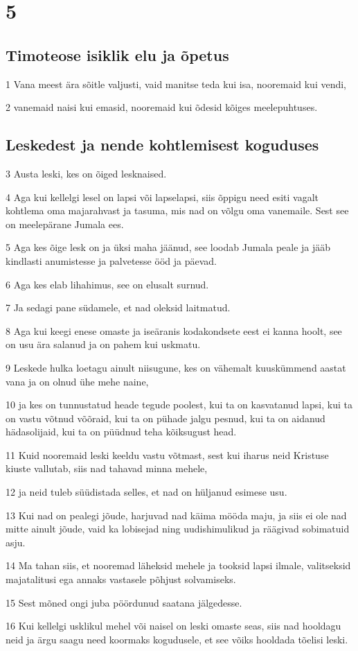 \chapter{5}

\section*{Timoteose isiklik elu ja õpetus}

\par 1 Vana meest ära sõitle valjusti, vaid manitse teda kui isa, nooremaid kui vendi,
\par 2 vanemaid naisi kui emasid, nooremaid kui õdesid kõiges meelepuhtuses.

\section*{Leskedest ja nende kohtlemisest koguduses}

\par 3 Austa leski, kes on õiged lesknaised.
\par 4 Aga kui kellelgi lesel on lapsi või lapselapsi, siis õppigu need esiti vagalt kohtlema oma majarahvast ja tasuma, mis nad on võlgu oma vanemaile. Sest see on meelepärane Jumala ees.
\par 5 Aga kes õige lesk on ja üksi maha jäänud, see loodab Jumala peale ja jääb kindlasti anumistesse ja palvetesse ööd ja päevad.
\par 6 Aga kes elab lihahimus, see on elusalt surnud.
\par 7 Ja sedagi pane südamele, et nad oleksid laitmatud.
\par 8 Aga kui keegi enese omaste ja iseäranis kodakondsete eest ei kanna hoolt, see on usu ära salanud ja on pahem kui uskmatu.
\par 9 Leskede hulka loetagu ainult niisugune, kes on vähemalt kuuskümmend aastat vana ja on olnud ühe mehe naine,
\par 10 ja kes on tunnustatud heade tegude poolest, kui ta on kasvatanud lapsi, kui ta on vastu võtnud võõraid, kui ta on pühade jalgu pesnud, kui ta on aidanud hädasolijaid, kui ta on püüdnud teha kõiksugust head.
\par 11 Kuid nooremaid leski keeldu vastu võtmast, sest kui iharus neid Kristuse kiuste vallutab, siis nad tahavad minna mehele,
\par 12 ja neid tuleb süüdistada selles, et nad on hüljanud esimese usu.
\par 13 Kui nad on pealegi jõude, harjuvad nad käima mööda maju, ja siis ei ole nad mitte ainult jõude, vaid ka lobisejad ning uudishimulikud ja räägivad sobimatuid asju.
\par 14 Ma tahan siis, et nooremad läheksid mehele ja tooksid lapsi ilmale, valitseksid majatalitusi ega annaks vastasele põhjust solvamiseks.
\par 15 Sest mõned ongi juba pöördunud saatana jälgedesse.
\par 16 Kui kellelgi usklikul mehel või naisel on leski omaste seas, siis nad hooldagu neid ja ärgu saagu need koormaks kogudusele, et see võiks hooldada tõelisi leski.

